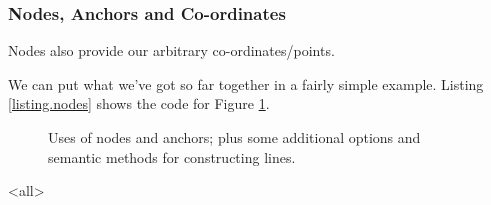 \begin{frame}
	\frametitle{Nodes, Anchors and Co-ordinates}
	Nodes also provide our arbitrary co-ordinates/points.
	\begin{center}
		
	\end{center}
\end{frame}

We can put what we've got so far together in a fairly simple example.
Listing \ref{listing.nodes} shows the code for Figure \ref{figure.nodes}.

\begin{figure}[btp]
	\centering
	
	\caption{Uses of nodes and anchors; plus some additional options and semantic methods for constructing lines.}
	\label{figure.nodes}
\end{figure}



\mode<all>	%
